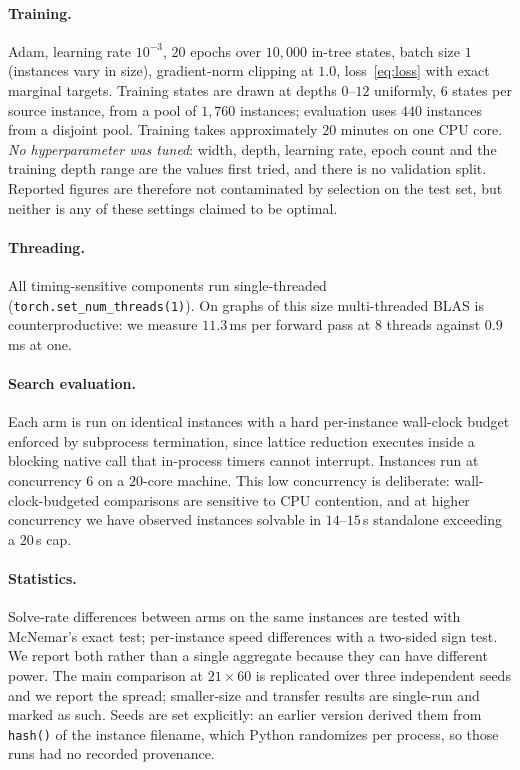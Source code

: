 \documentclass[final,5p,times,twocolumn]{elsarticle}
\begin{document}
\paragraph{Training.} Adam, learning rate $10^{-3}$, $20$ epochs over $10{,}000$ in-tree states, batch size $1$ (instances vary in size), gradient-norm clipping at $1.0$, loss~\eqref{eq:loss} with exact marginal targets. Training states are drawn at depths $0$--$12$ uniformly, $6$ states per source instance, from a pool of $1{,}760$ instances; evaluation uses $440$ instances from a disjoint pool. Training takes approximately $20$ minutes on one CPU core. \emph{No hyperparameter was tuned}: width, depth, learning rate, epoch count and the training depth range are the values first tried, and there is no validation split. Reported figures are therefore not contaminated by selection on the test set, but neither is any of these settings claimed to be optimal.

\paragraph{Threading.} All timing-sensitive components run single-threaded (\texttt{torch.set\_\allowbreak num\_\allowbreak threads(1)}). On graphs of this size multi-threaded BLAS is counterproductive: we measure $11.3$\,ms per forward pass at $8$ threads against $0.9$\,ms at one.

\paragraph{Search evaluation.} Each arm is run on identical instances with a hard per-instance wall-clock budget enforced by subprocess termination, since lattice reduction executes inside a blocking native call that in-process timers cannot interrupt. Instances run at concurrency $6$ on a $20$-core machine. This low concurrency is deliberate: wall-clock-budgeted comparisons are sensitive to CPU contention, and at higher concurrency we have observed instances solvable in $14$--$15$\,s standalone exceeding a $20$\,s cap.

\paragraph{Statistics.} Solve-rate differences between arms on the same instances are tested with McNemar's exact test; per-instance speed differences with a two-sided sign test. We report both rather than a single aggregate because they can have different power. The main comparison at $21\times60$ is replicated over three independent seeds and we report the spread; smaller-size and transfer results are single-run and marked as such. Seeds are set explicitly: an earlier version derived them from \texttt{hash()} of the instance filename, which Python randomizes per process, so those runs had no recorded provenance.
\end{document}
